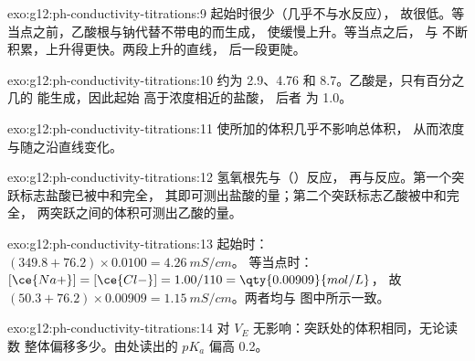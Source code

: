 \begin{solution}{exo:g12:ph-conductivity-titrations:9}
起始时很少（几乎不与水反应），
故很低。等当点之前，乙酸根与钠代替不带电的而生成，
使缓慢上升。等当点之后，
 与  不断积累，上升得更快。两段上升的直线，
后一段更陡。
\end{solution}

\begin{solution}{exo:g12:ph-conductivity-titrations:10}
约为 2.9、4.76 和 8.7。乙酸是，只有百分之几的
能生成，因此起始  高于浓度相近的盐酸，
后者  为 1.0。
\end{solution}

\begin{solution}{exo:g12:ph-conductivity-titrations:11}
使所加的体积几乎不影响总体积，
从而浓度与随之沿直线变化。
\end{solution}

\begin{solution}{exo:g12:ph-conductivity-titrations:12}
氢氧根先与（）反应，
再与反应。第一个突跃标志盐酸已被中和完全，
其即可测出盐酸的量；第二个突跃标志乙酸被中和完全，
两突跃之间的体积可测出乙酸的量。
\end{solution}

\begin{solution}{exo:g12:ph-conductivity-titrations:13}
起始时：$(349.8 + 76.2) \times 0.0100 = \qty{4.26}{mS/cm}$。
等当点时：$[\ce{Na+}] = [\ce{Cl-}] = 1.00/110 = \qty{0.00909}{mol/L}$，
故 $(50.3 + 76.2) \times 0.00909 = \qty{1.15}{mS/cm}$。两者均与
图中所示一致。
\end{solution}

\begin{solution}{exo:g12:ph-conductivity-titrations:14}
对 $V_E$ 无影响：突跃处的体积相同，无论读数
整体偏移多少。由处读出的 $pK_a$ 偏高 0.2。
\end{solution}

